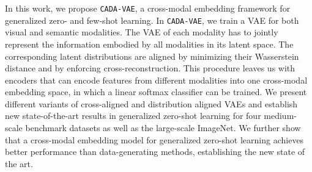 \documentclass[10pt,twocolumn,letterpaper]{article}
\begin{document}
In this work, we propose \texttt{CADA-VAE}, a cross-modal embedding framework for generalized zero- and few-shot learning. In \texttt{CADA-VAE}, we train a VAE for both visual and semantic modalities. The VAE of each modality has to jointly represent the information embodied by all modalities in its latent space. The corresponding latent distributions are aligned by minimizing their Wasserstein distance and by enforcing cross-reconstruction. This procedure leaves us with encoders that can encode features from different modalities into one cross-modal embedding space, in which a linear softmax classifier can be trained.
We present different variants of cross-aligned and distribution aligned VAEs and establish new state-of-the-art results in generalized zero-shot learning for four medium-scale benchmark datasets as well as the large-scale ImageNet. We further show that a cross-modal embedding model for generalized zero-shot learning achieves better performance than data-generating methods, establishing the new state of the art.

{\small


}
\end{document}
